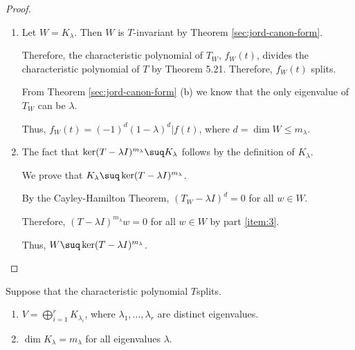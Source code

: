 \documentclass[11pt]{scrartcl}
\begin{document}
  \begin{proof}
    \hfill

    \begin{enumerate}[label=\alph*)]
    \item Let $W = K_{\lambda}$. Then $W$ is $T$-invariant by Theorem \ref{sec:jord-canon-form}.

      Therefore, the characteristic polynomial of $T_W$, $f_W(t)$,
      divides the characteristic polynomial of $T$ by Theorem 5.21. Therefore, $f_W(t)$ splits.

      From Theorem \ref{sec:jord-canon-form} (b) we know that the only
      eigenvalue of $T_{W}$ can be $\lambda$.

      Thus, $f_W(t) = (-1)^d(1-\lambda)^d | f(t)$, where $d = \dim W\leq m_{\lambda}$.
    \item The fact that
      $\ker (T-\lambda I)^{m_{\lambda}} \suq K_{\lambda}$ follows by
      the definition of $K_{\lambda}$.

      We prove that $K_{\lambda} \suq \ker (T-\lambda I)^{m_{\lambda}}$.

      By the Cayley-Hamilton Theorem, $(T_W-\lambda I)^d=0$ for all $w\in W$.

      Therefore, $(T-\lambda I)^{m_{\lambda}}w = 0$ for all $w\in W$ by part \ref{item:3}.

      Thus, $W\suq \ker (T-\lambda I)^{m_{\lambda}}$.
    \end{enumerate}
  \end{proof}

  \begin{theorem}
    Suppose that the characteristic polynomial $T$splits.

    \begin{enumerate}[label=\alph*)]
    \item $V = \bigoplus_{i=1}^r K_{\lambda_{i}}$, where $\lambda_1,\dots, \lambda_r$ are distinct eigenvalues.
    \item $\dim K_{\lambda}= m_{\lambda}$ for all eigenvalues $\lambda$.
    \end{enumerate}
  \end{theorem}
\end{document}
